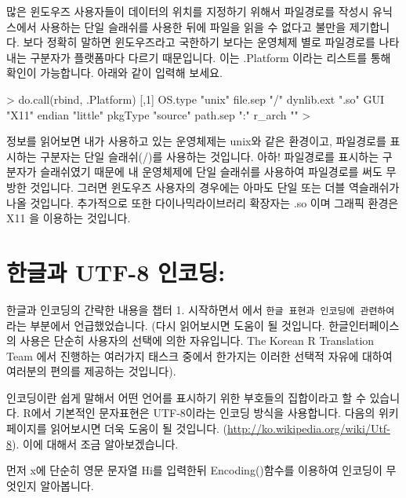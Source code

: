 \documentclass[tutorial.tex]{subfiles}
\begin{document}
많은 윈도우즈 사용자들이 데이터의 위치를 지정하기 위해서 파일경로를 작성시 유닉스에서 사용하는 단일 슬래쉬를 사용한 뒤에 파일을 읽을 수 없다고 불만을 제기합니다. 
보다 정확히 말하면 윈도우즈라고 국한하기 보다는 운영체제 별로 파일경로를 나타내는 구분자가 플랫폼마다 다르기 때문입니다. 
이는 .Platform 이라는 리스트를 통해 확인이 가능합니다. 
아래와 같이 입력해 보세요.

\begin{Schunk}
\begin{Soutput}
> do.call(rbind, .Platform)
           [,1]    
OS.type    "unix"  
file.sep   "/"     
dynlib.ext ".so"   
GUI        "X11"   
endian     "little"
pkgType    "source"
path.sep   ":"     
r_arch     ""      
> 
\end{Soutput}
\end{Schunk}

정보를 읽어보면 내가 사용하고 있는 운영체제는 unix와 같은 환경이고, 파일경로를 표시하는 구분자는 단일 슬래쉬(/)를 사용하는 것입니다.
아하! 파일경로를 표시하는 구분자가 슬래쉬였기 때문에 내 운영체제에 단일 슬래쉬를 사용하여 파일경로를 써도 무방한 것입니다.
그러면 윈도우즈 사용자의 경우에는 아마도 단일 또는 더블 역슬래쉬가 나올 것입니다.
추가적으로 또한 다이나믹라이브러리 확장자는 .so 이며 그래픽 환경은 X11 을 이용하는 것입니다. 


\section{한글과 UTF-8 인코딩:} 

한글과 인코딩의 간략한 내용을 챕터 1. 시작하면서 에서 \texttt{한글 표현과 인코딩에 관련하여} 라는 부분에서 언급했었습니다.
(다시 읽어보시면 도움이 될 것입니다.
한글인터페이스의 사용은 단순히 사용자의 선택에 의한 자유입니다.
The Korean R Translation Team 에서 진행하는 여러가지 태스크 중에서 한가지는 이러한 선택적 자유에 대하여 여러분의 편의를 제공하는 것입니다).

인코딩이란 쉽게 말해서 어떤 언어를 표시하기 위한 부호들의 집합이라고 할 수 있습니다.
R에서 기본적인 문자표현은 UTF-8이라는 인코딩 방식을 사용합니다.
다음의 위키페이지를 읽어보시면 더욱 도움이 될 것입니다. (\href{http://ko.wikipedia.org/wiki/Utf-8}{http://ko.wikipedia.org/wiki/Utf-8}).
이에 대해서 조금 알아보겠습니다.

먼저 x에 단순히 영문 문자열 Hi를 입력한뒤 Encoding()함수를 이용하여 인코딩이 무엇인지 알아봅니다.
\begin{Schunk}
\end{Schunk}
\end{document}
